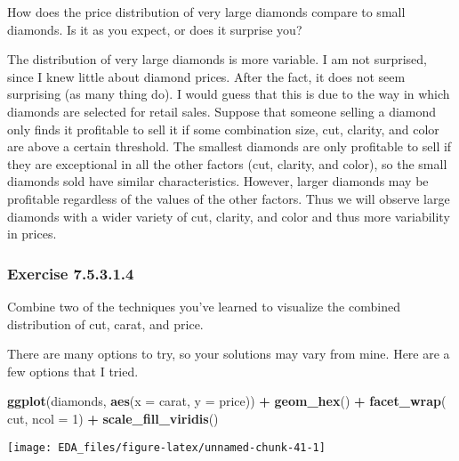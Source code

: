 \documentclass[]{book}
\newenvironment{Shaded}{\begin{snugshade}}{\end{snugshade}}
\newcommand{\DataTypeTok}[1]{\textcolor[rgb]{0.13,0.29,0.53}{#1}}
\newcommand{\DecValTok}[1]{\textcolor[rgb]{0.00,0.00,0.81}{#1}}
\newcommand{\KeywordTok}[1]{\textcolor[rgb]{0.13,0.29,0.53}{\textbf{#1}}}
\newcommand{\NormalTok}[1]{#1}
\newcommand{\OperatorTok}[1]{\textcolor[rgb]{0.81,0.36,0.00}{\textbf{#1}}}
\newcommand{\StringTok}[1]{\textcolor[rgb]{0.31,0.60,0.02}{#1}}
\theoremstyle{plain}
\theoremstyle{remark}
\begin{document}
How does the price distribution of very large diamonds compare to small
diamonds. Is it as you expect, or does it surprise you?

The distribution of very large diamonds is more variable. I am not
surprised, since I knew little about diamond prices. After the fact, it
does not seem surprising (as many thing do). I would guess that this is
due to the way in which diamonds are selected for retail sales. Suppose
that someone selling a diamond only finds it profitable to sell it if
some combination size, cut, clarity, and color are above a certain
threshold. The smallest diamonds are only profitable to sell if they are
exceptional in all the other factors (cut, clarity, and color), so the
small diamonds sold have similar characteristics. However, larger
diamonds may be profitable regardless of the values of the other
factors. Thus we will observe large diamonds with a wider variety of
cut, clarity, and color and thus more variability in prices.

\hypertarget{exercise-7.5.3.1.4}{%
\subsubsection*{\texorpdfstring{Exercise
{7.5.3.1.4}}{Exercise 7.5.3.1.4}}\label{exercise-7.5.3.1.4}}

Combine two of the techniques you've learned to visualize the combined
distribution of cut, carat, and price.

There are many options to try, so your solutions may vary from mine.
Here are a few options that I tried.

\begin{Shaded}
\begin{Highlighting}[]
\KeywordTok{ggplot}\NormalTok{(diamonds, }\KeywordTok{aes}\NormalTok{(}\DataTypeTok{x =}\NormalTok{ carat, }\DataTypeTok{y =}\NormalTok{ price)) }\OperatorTok{+}
\StringTok{  }\KeywordTok{geom_hex}\NormalTok{() }\OperatorTok{+}
\StringTok{  }\KeywordTok{facet_wrap}\NormalTok{(}\OperatorTok{~}\StringTok{ }\NormalTok{cut, }\DataTypeTok{ncol =} \DecValTok{1}\NormalTok{) }\OperatorTok{+}
\StringTok{  }\KeywordTok{scale_fill_viridis}\NormalTok{()}
\end{Highlighting}
\end{Shaded}

\begin{center}\texttt{[image: EDA\_files/figure-latex/unnamed-chunk-41-1]} \end{center}
\end{document}
